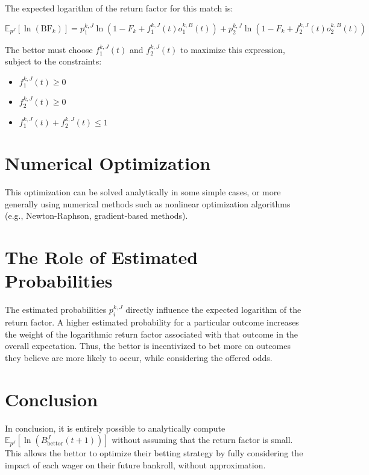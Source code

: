 The expected logarithm of the return factor for this match is:

\[
\mathbb{E}_{p^{J}}\left[ \ln\left( \text{BF}_k \right) \right] = p_1^{k,J} \ln\left( 1 - F_k + f_1^{k,J}(t) o_1^{k,B}(t) \right) + p_2^{k,J} \ln\left( 1 - F_k + f_2^{k,J}(t) o_2^{k,B}(t) \right)
\]

The bettor must choose \( f_1^{k,J}(t) \) and \( f_2^{k,J}(t) \) to maximize this expression, subject to the constraints:

\begin{itemize}
\item \( f_1^{k,J}(t) \geq 0 \)
\item \( f_2^{k,J}(t) \geq 0 \)
\item \( f_1^{k,J}(t) + f_2^{k,J}(t) \leq 1 \)
\end{itemize}
\section{Numerical Optimization}

This optimization can be solved analytically in some simple cases, or more generally using numerical methods such as nonlinear optimization algorithms (e.g., Newton-Raphson, gradient-based methods).

\section{The Role of Estimated Probabilities}

The estimated probabilities \( p_i^{k,J} \) directly influence the expected logarithm of the return factor. A higher estimated probability for a particular outcome increases the weight of the logarithmic return factor associated with that outcome in the overall expectation. Thus, the bettor is incentivized to bet more on outcomes they believe are more likely to occur, while considering the offered odds.

\section{Conclusion}

In conclusion, it is entirely possible to analytically compute \( \mathbb{E}_{p^{J}}\left[ \ln\left( B_{\text{bettor}}^J(t+1) \right) \right] \) without assuming that the return factor is small. This allows the bettor to optimize their betting strategy by fully considering the impact of each wager on their future bankroll, without approximation.
